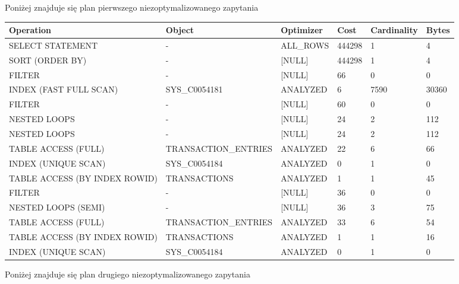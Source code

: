 \documentclass[11pt]{article}
\numberwithin{figure}{subsection}
\begin{document}
		Poniżej znajduje się plan pierwszego niezoptymalizowanego zapytania \\
		
		\begin{tabularx}{\textwidth}{|X|X|X|X|X|X|}
Operation&Object&Optimizer&Cost&Cardinality&Bytes\\ \hline
SELECT STATEMENT& - &ALL\_ROWS&444298&1&4\\ \hline
SORT (ORDER BY)& - &[NULL]&444298&1&4\\ \hline
FILTER& - &[NULL]&66&0&0\\ \hline
INDEX (FAST FULL SCAN)&SYS\_C0054181&ANALYZED&6&7590&30360\\ \hline
FILTER& - &[NULL]&60&0&0\\ \hline
NESTED LOOPS& - &[NULL]&24&2&112\\ \hline
NESTED LOOPS& - &[NULL]&24&2&112\\ \hline
TABLE ACCESS (FULL)&TRANSACTION\_ENTRIES&ANALYZED&22&6&66\\ \hline
INDEX (UNIQUE SCAN)&SYS\_C0054184&ANALYZED&0&1&0\\ \hline
TABLE ACCESS (BY INDEX ROWID)&TRANSACTIONS&ANALYZED&1&1&45\\ \hline
FILTER& - &[NULL]&36&0&0\\ \hline
NESTED LOOPS (SEMI)& - &[NULL]&36&3&75\\ \hline
TABLE ACCESS (FULL)&TRANSACTION\_ENTRIES&ANALYZED&33&6&54\\ \hline
TABLE ACCESS (BY INDEX ROWID)&TRANSACTIONS&ANALYZED&1&1&16\\ \hline
INDEX (UNIQUE SCAN)&SYS\_C0054184&ANALYZED&0&1&0\\ \hline
		\end{tabularx}
		
		Poniżej znajduje się plan drugiego niezoptymalizowanego zapytania \\
		
\end{document}
